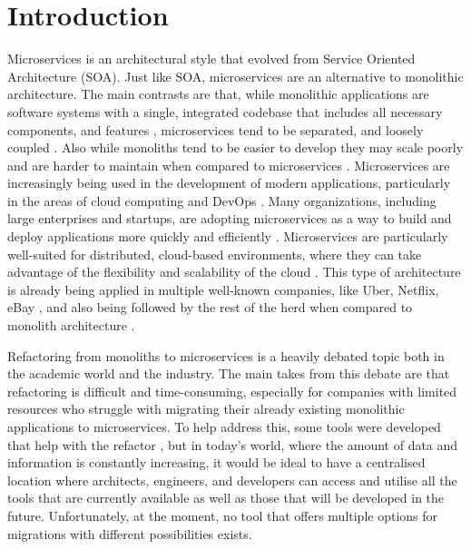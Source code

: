 \section{Introduction} \label{sec:introduction}

Microservices is an architectural style that evolved from Service Oriented
Architecture (SOA). Just like SOA, microservices are an alternative to
monolithic architecture. The main contrasts are that, while monolithic
applications are software systems with a single, integrated codebase that
includes all necessary components, and features
\cite{kazanavivcius2019migrating}, microservices tend to be separated, and
loosely coupled \cite{newman2021building}. Also while monoliths tend to be
easier to develop they may scale poorly and are harder to maintain when
compared to microservices \cite{newman2019monolith}. Microservices are
increasingly being used in the development of modern applications, particularly
in the areas of cloud computing and DevOps \cite{ren2018migrating}. Many
organizations, including large enterprises and startups, are adopting
microservices as a way to build and deploy applications more quickly and
efficiently \cite{richardson-microservices}. Microservices are particularly
well-suited for distributed, cloud-based environments, where they can take
advantage of the flexibility and scalability of the cloud
\cite{fowler-microservices-prerequisites}. This type of architecture is already
being applied in multiple well-known companies, like Uber, Netflix, eBay
\cite{microservices-users}, and also being followed by the rest of the herd
when compared to monolith architecture \cite{taibi2017processes}.

Refactoring from monoliths to microservices is a heavily debated topic both in
the academic world and the industry. The main takes from this debate are that
refactoring is difficult and time-consuming, especially for companies with
limited resources who struggle with migrating their already existing monolithic
applications to microservices. To help address this, some tools were developed
that help with the refactor , but in today's world, where the
amount of data and information is constantly increasing, it would be ideal to
have a centralised location where architects, engineers, and developers can
access and utilise all the tools that are currently available as well as those
that will be developed in the future. Unfortunately, at the moment, no tool
that offers multiple options for migrations with different possibilities
exists.

